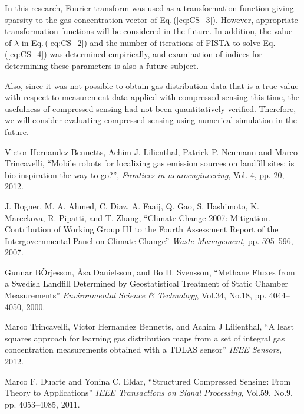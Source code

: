 \documentclass[fleqn,10pt,twocolumn]{SICE19}
\newcommand{\Eqref}[1]{Eq.\,(\ref{#1})}
\begin{document}
In this research, Fourier transform was used as a transformation function giving sparsity to the gas concentration vector of \Eqref{eq:CS_3}. However, appropriate transformation functions will be considered in the future. In addition, the value of $\lambda$ in \Eqref{eq:CS_2} and the number of iterations of FISTA to solve \Eqref{eq:CS_4} was determined empirically, and examination of indices for determining these parameters is also a future subject.

Also, since it was not possible to obtain gas distribution data that is a true value with respect to measurement data applied with compressed sensing this time, the usefulness of compressed sensing had not been quantitatively verified. Therefore, we will consider evaluating compressed sensing using numerical simulation in the future.



\begin{thebibliography}{9}

Victor Hernandez Bennetts, Achim J. Lilienthal, Patrick P. Neumann and Marco Trincavelli, ``Mobile robots for localizing gas emission sources on landfill sites: is bio-inspiration the way to go?'',
{\it Frontiers in neuroengineering}, Vol. 4, pp. 20, 2012.

J. Bogner, M. A. Ahmed, C. Diaz, A. Faaij, Q. Gao, S. Hashimoto, K. Mareckova, R. Pipatti, and T. Zhang, ``Climate Change 2007: Mitigation. Contribution of Working Group III to the Fourth Assessment Report of the Intergovernmental Panel on Climate Change''
{\it Waste Management}, pp. 595--596, 2007.

Gunnar BÖrjesson, Åsa Danielsson, and Bo H. Svensson, ``Methane Fluxes from a Swedish Landfill Determined by Geostatistical Treatment of Static Chamber Measurements''
{\it Environmental Science \& Technology}, Vol.34, No.18, pp. 4044--4050, 2000.

Marco Trincavelli, Victor Hernandez Bennetts, and Achim J Lilienthal, ``A least squares approach for learning gas distribution maps from a set of integral gas concentration measurements obtained with a TDLAS sensor''
{\it IEEE Sensors}, 2012.

Marco F. Duarte and Yonina C. Eldar, ``Structured Compressed Sensing: From Theory to Applications''
{\it IEEE Transactions on Signal Processing}, Vol.59, No.9, pp. 4053--4085, 2011.


\end{thebibliography}
\end{document}

